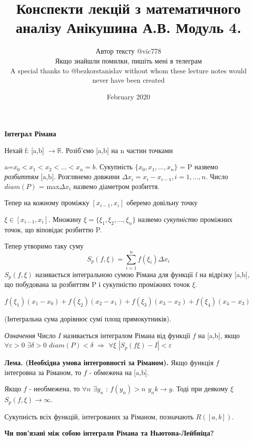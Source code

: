 \documentclass[12pt]{report}
\title{Конспекти лекцій з математичного аналізу Анікушина А.В. Модуль 4.}
\author{Автор тексту @vic778 \\ Якщо знайшли помилки, пишіть мені в телеграм \\  \small{A special thanks to @bezkorstanislav without whom these lecture notes would never have been created}}
\date{February 2020}
\begin{document}
	\maketitle
	
	\begin{center}
		\textbf{\Large Інтеграл Рімана} 
	\end{center}
	
	Нехай f: [a,b]	$\rightarrow \mathbb{R}$. Розіб'ємо [a,b] на n частин точками 
	
	a=$x_0<x_1<x_2<...<x_n=b$. Сукупність  $\{x_0, x_1, ..., x_n\}$ = P назвемо \textit{ розбиттям} [a,b]. Розглянемо довжини $\Delta x_i = x_i - x_{i-1},     i = 1, ..., n.$
	Число $\textit{diam} (P)$ = max$ \Delta x_i$ назвемо $\textit{діаметром}$ розбиття.
	
	Тепер на кожному проміжку $[x_{i-1}, x_i]$ оберемо довільну точку  
	
	$\xi \in [x_{i-1}, x_i]$. Множину $\xi = \{\xi_1, \xi_2, ..., \xi_n\}$ назвемо  \textit{сукупністю} проміжних точок, що віповідає розбиттю P. 
	
	Тепер утворимо таку суму \[  S_p (f, \xi)  = \sum\limits_{i=1}^n f(\xi_i)\Delta x_i \]
	$ S_p (f, \xi)   $ називається інтегральною сумою Рімана для функції f на відрізку [a,b], що побудована за розбиттям P і сукупністю проміжних точок $ \xi $.
	
	$ f(\xi_1)(x_1 - x_0)+ f(\xi_2)(x_2 - x_1)+ f(\xi_3)(x_3 - x_2) +f(\xi_4)(x_4- x_3) $ 
	
	(Інтегральна сума дорівнює сумі площ прямокутників).
	
	\textit{Означення} Число $I$ називається $\textit{інтегралом Рімана} $ від функції  $ f $
	на [a,b], якщо $ \forall \varepsilon > 0 $   $ \exists \delta > 0$   $ diam (P) < \delta$ $\Rightarrow  $ $ \forall \xi $ $ |S_p(f\xi) - I|  < \varepsilon$
	
	\vspace{5 mm} 
	
	\textbf{Лема. (Необхідна умова інтегровності за Ріманом).} Якщо функція $ f $ інтегровна за Ріманом, то $ f $ - обмежена на [a,b].
	
	Якщо $ f $ - необмежена, то $ \forall n $  $ \exists y_n $ : $ f(y_n) > n$ $ y_nk \rightarrow y $. Тоді при деякому $ \xi $ $ S_p (f, \xi)  \rightarrow \infty$.
	
	\vspace{5 mm} 
	Сукупність всіх функцій, інтегрованих за Ріманом, позначають $ R([a,b]) $.
	
	\begin{center}
		\textbf{\Large Чи пов'язані між собою інтеграли Рімана та Ньютона-Лейбніца?} 
	\end{center}
	
\end{document}
